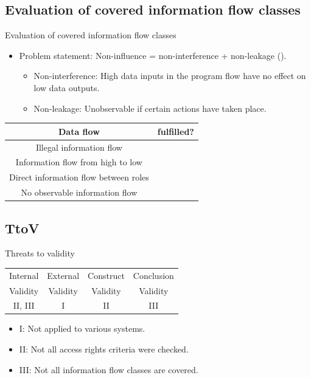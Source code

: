 \documentclass[18pt]{beamer}
\newcommand{\cmark}{\ding{51}}
\newcommand{\xmark}{\ding{55}}%
\begin{document}
\subsection{Evaluation of covered information flow classes}
\begin{frame}{Evaluation of covered information flow classes}
\begin{itemize}
\item Problem statement: Non-influence = non-interference + non-leakage (\cite{Noninfluence}).
\begin{itemize}
\item Non-interference:  High data inputs in the program flow have no effect on low data outputs. 
\item Non-leakage: Unobservable if certain actions have taken place.
\end{itemize}
\end{itemize}


\pause
\begin{table}
\centering
\begin{tabular}{|c|c|} 
\hline 
Data flow & fulfilled? \\ 
\hline 
Illegal information flow & \cmark \\ 
\hline 
Information flow from high to low & \cmark \\  
\hline 
Direct information flow between roles & \xmark \\ 
\hline 
No observable information  flow & \xmark \\
\hline 
\end{tabular}
\end{table}
\end{frame}

\subsection{TtoV}
\begin{frame}{Threats to validity}
\begin{table}
\centering
\begin{tabular}{|c|c|c|c|}
\hline 
Internal & External & Construct & Conclusion \\ 
Validity & Validity & Validity & Validity\\
\hline 
II, III & I & II & III \\ 
\hline 
\end{tabular} 
\end{table}
\begin{itemize}
\item I:   Not  applied to various systems.
\item II:  Not all access rights criteria were checked. 
\item III: Not all information flow classes are covered.
\end{itemize}
\end{frame}
\end{document}
